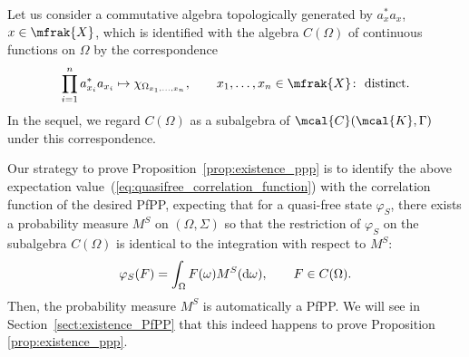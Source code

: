 Let us consider a commutative algebra topologically generated by $a_{x}^{\ast}a_{x}$, $x\in\mfrak{X}$, which is identified with the algebra $C(\Omega)$ of continuous functions on $\Omega$ by the correspondence
\begin{equation*}
	\prod_{i=1}^{n}a_{x_{i}}^{\ast}a_{x_{i}}\mapsto \chi_{\Omega_{x_{1},\dots, x_{n}}},\qquad x_{1},\dots, x_{n}\in\mfrak{X}\colon \ \mbox{distinct.}
\end{equation*}
In the sequel, we regard $C(\Omega)$ as a subalgebra of $\mcal{C}(\mcal{K},\Gamma)$ under this correspondence.

Our strategy to prove Proposition~\ref{prop:existence_ppp} is to identify the above expectation value~(\ref{eq:quasifree_correlation_function}) with the correlation function of the desired PfPP, expecting that for a quasi-free state $\varphi_{S}$, there exists a probability measure $M^{S}$ on $(\Omega,\Sigma)$ so that the restriction of $\varphi_{S}$ on the subalgebra $C(\Omega)$ is identical to the integration with respect to $M^{S}$:
\begin{equation*}
	\varphi_{S}(F)=\int_{\Omega}F(\omega)M^{S}({\rm d}\omega),\qquad F\in C(\Omega).
\end{equation*}
Then, the probability measure $M^{S}$ is automatically a PfPP.
We will see in Section~\ref{sect:existence_PfPP} that this indeed happens to prove Proposition \ref{prop:existence_ppp}.

